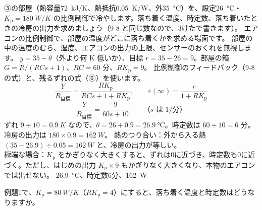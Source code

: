 \label{ph:波-4:ex1}
\begin{phreidai}
③の部屋（熱容量\qty{72}{kJ/K}、熱抵抗\qty{0.05}{K/W}、外\qty{35}{\celsius}）を、設定\qty{26}{\celsius}・$K_{\mathrm p}=\qty{180}{W/K}$ の比例制御で冷やします。落ち着く温度、時定数、落ち着いたときの冷房の出力を求めましょう（9-8 と同じ数なので、3けたで書きます）。
\phbamen
エアコンの比例制御で、部屋の温度がどこに落ち着くかを求める場面です。
\phmushi
部屋の中の温度のむら、湿度、エアコンの出力の上限、センサーのおくれを無視します。
\phzu
$y=35-\theta$（外より何 K 低いか）、目標 $r=35-26=9$。部屋の箱 $G=R/(RCs+1)$、$RC=60$ 分、$RK_{\mathrm p}=9$。
\phriyu
比例制御のフィードバック（9-8 の式）と、残るずれの式（⑥）を使います。
\phtateru
\[\frac{Y}{R_{\text{目標}}}=\frac{RK_{\mathrm p}}{RCs+1+RK_{\mathrm p}},\qquad\varepsilon(\infty)=\frac{r}{1+RK_{\mathrm p}}\]
\phtoku
\[\frac{Y}{R_{\text{目標}}}=\frac{9}{60s+10}\qquad\text{（$s$ は 1/分）}\]
ずれ $9\div10=\qty{0.9}{K}$ なので、$\theta=26+0.9=\qty{26.9}{\celsius}$。時定数は $60\div10=6$ 分。冷房の出力は $180\times0.9=\qty{162}{W}$。
\phtashikame
熱のつり合い：外から入る熱 $(35-26.9)\div0.05=\qty{162}{W}$ と、冷房の出力が等しい。\\
極端な場合：$K_{\mathrm p}$ をかぎりなく大きくすると、ずれは0に近づき、時定数も0に近づく。ただし、はじめの出力 $K_{\mathrm p}\times9$ もかぎりなく大きくなり、本物のエアコンでは出せない。
\kotae \qty{26.9}{\celsius}、時定数6分、\qty{162}{W}
\end{phreidai}
\begin{jibun}
例題1で、$K_{\mathrm p}=\qty{80}{W/K}$（$RK_{\mathrm p}=4$）にすると、落ち着く温度と時定数はどうなりますか。
\end{jibun}

